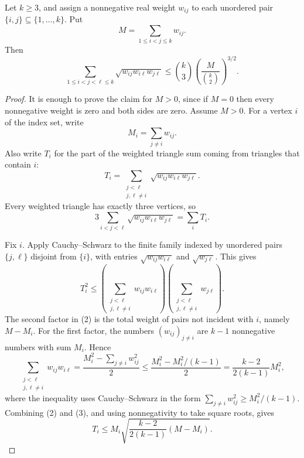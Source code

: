 \begin{lemma}
Let $k\ge 3$, and assign a nonnegative real weight $w_{ij}$ to each unordered
pair $\{i,j\}\subseteq \{1,\ldots,k\}$.  Put
\[
M=\sum_{1\le i<j\le k}w_{ij}.
\]
Then
\[
\sum_{1\le i<j<\ell\le k}\sqrt{w_{ij}w_{i\ell}w_{j\ell}}
\le
\binom{k}{3}\left(\frac{M}{\binom{k}{2}}\right)^{3/2}.
\]
\end{lemma}
\begin{proof}
It is enough to prove the claim for $M>0$, since if $M=0$ then every
nonnegative weight is zero and both sides are zero.  Assume $M>0$.
For a vertex $i$ of the index set, write
\[
M_i=\sum_{j\ne i}w_{ij}.
\]
Also write $T_i$ for the part of the weighted triangle sum coming from
triangles that contain $i$:
\[
T_i=\sum_{\substack{j<\ell\\ j,\ell\ne i}}
\sqrt{w_{ij}w_{i\ell}w_{j\ell}}.
\]
Every weighted triangle has exactly three vertices, so
\[
3\sum_{i<j<\ell}\sqrt{w_{ij}w_{i\ell}w_{j\ell}}
=\sum_i T_i. \tag{1}
\]

Fix $i$.  Apply Cauchy--Schwarz to the finite family indexed by unordered
pairs $\{j,\ell\}$ disjoint from $\{i\}$, with entries
$\sqrt{w_{ij}w_{i\ell}}$ and $\sqrt{w_{j\ell}}$.  This gives
\[
T_i^2
\le
\left(\sum_{\substack{j<\ell\\ j,\ell\ne i}} w_{ij}w_{i\ell}\right)
\left(\sum_{\substack{j<\ell\\ j,\ell\ne i}} w_{j\ell}\right). \tag{2}
\]
The second factor in (2) is the total weight of pairs not incident with
$i$, namely $M-M_i$.  For the first factor, the numbers
$(w_{ij})_{j\ne i}$ are $k-1$ nonnegative numbers with sum $M_i$.  Hence
\[
\sum_{\substack{j<\ell\\ j,\ell\ne i}}w_{ij}w_{i\ell}
=\frac{M_i^2-\sum_{j\ne i}w_{ij}^2}{2}
\le
\frac{M_i^2-M_i^2/(k-1)}2
=\frac{k-2}{2(k-1)}M_i^2, \tag{3}
\]
where the inequality uses Cauchy--Schwarz in the form
$\sum_{j\ne i}w_{ij}^2\ge M_i^2/(k-1)$.  Combining (2) and (3), and using
nonnegativity to take square roots, gives
\[
T_i\le
M_i\sqrt{\frac{k-2}{2(k-1)}(M-M_i)}. \tag{4}
\]


\end{proof}
